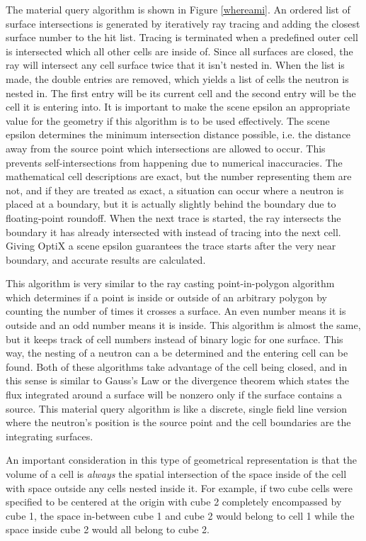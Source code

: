 The material query algorithm is shown in Figure \ref{whereami}.  An ordered list of surface intersections is generated by iteratively ray tracing and adding the closest surface number to the hit list.  Tracing is terminated when a predefined outer cell is intersected which all other cells are inside of.  Since all surfaces are closed, the ray will intersect any cell surface twice that it isn't nested in.  When the list is made, the double entries are removed, which yields a list of cells the neutron is nested in.  The first entry will be its current cell and the second entry will be the cell it is entering into.  It is important to make the scene epsilon an appropriate value for the geometry if this algorithm is to be used effectively.  The scene epsilon determines the minimum intersection distance possible, i.e. the distance away from the source point which intersections are allowed to occur.  This prevents self-intersections from happening due to numerical inaccuracies.  The mathematical cell descriptions are exact, but the number representing them are not, and if they are treated as exact, a situation can occur where a neutron is placed at a boundary, but it is actually slightly behind the boundary due to floating-point roundoff.  When the next trace is started, the ray intersects the boundary it has already intersected with instead of tracing into the next cell.  Giving OptiX a scene epsilon guarantees the trace starts after the very near boundary, and accurate results are calculated.

This algorithm is very similar to the ray casting point-in-polygon algorithm which determines if a point is inside or outside of an arbitrary polygon by counting the number of times it crosses a surface.  An even number means it is outside and an odd number means it is inside.  This algorithm is almost the same, but it keeps track of cell numbers instead of binary logic for one surface.  This way, the nesting of a neutron can a be determined and the entering cell can be found.  Both of these algorithms take advantage of the cell being closed, and in this sense is similar to Gauss's Law or the divergence theorem which states the flux integrated around a surface will be nonzero only if the surface contains a source.  This material query algorithm is like a discrete, single field line version where the neutron's position is the source point and the cell boundaries are the integrating surfaces.

An important consideration in this type of geometrical representation is that the volume of a cell is \emph{always} the spatial intersection of the space inside of the cell with space outside any cells nested inside it.  For example, if two cube cells were specified to be centered at the origin with cube 2 completely encompassed by cube 1, the space in-between cube 1 and cube 2 would belong to cell 1 while the space inside cube 2 would all belong to cube 2.

